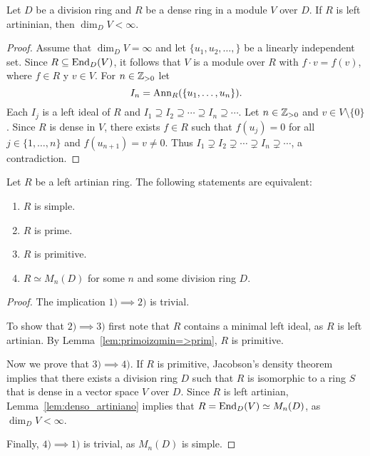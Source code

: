 \begin{lemma}
	\label{lem:denso_artiniano}
	Let $D$ be a division ring and $R$ be a dense ring in a module $V$ over $D$. 
	If $R$ is left artininian, then $\dim_DV<\infty$.
\end{lemma}

\begin{proof}
	Assume that $\dim_DV=\infty$ and let $\{u_1,u_2,\dots,\}$ be a linearly independent set. 
	Since $R\subseteq\operatorname{End}_D(V)$, it follows that 
	$V$ is a module over $R$ with $f\cdot v=f(v)$, where $f\in R$ y $v\in V$. 
	For $n\in\mathbb{Z}_{>0}$ let 
	\[
		I_n=\operatorname{Ann}_R(\{u_1,\dots,u_n\}).
	\]
	Each $I_j$ is a left ideal of $R$ and $I_1\supseteq
	I_2\supseteq\cdots\supseteq I_n\supseteq\cdots$. Let 
	$n\in\mathbb{Z}_{>0}$ and $v\in V\setminus\{0\}$. Since $R$ is dense
	in $V$, there exists $f\in R$ such that $f(u_j)=0$ for all $j\in\{1,\dots,n\}$ and 
	$f(u_{n+1})=v\ne0$. Thus $I_1\supsetneq I_2\supsetneq\cdots\supsetneq
	I_n\supsetneq\cdots$, a contradiction.
\end{proof}

\begin{theorem}[Wedderburn]
	Let $R$ be a left artinian ring. The following statements are equivalent:
	\begin{enumerate}
		\item $R$ is simple.
		\item $R$ is prime.
		\item $R$ is primitive.
		\item $R\simeq M_n(D)$ for some $n$ and some division ring $D$.
	\end{enumerate}
\end{theorem}

\begin{proof}
	The implication $1)\implies2)$ is trivial. 
	
	To show that $2)\implies3)$ first note that 
	$R$ contains a minimal left ideal, as $R$ is left artinian. 
	By Lemma~\ref{lem:primoizqmin=>prim}, $R$ is primitive. 

	Now we prove that $3)\implies4)$. If $R$ is primitive, 
	Jacobson's density theorem implies that there exists a division
	ring $D$ such that  
	$R$ is isomorphic to a ring $S$ that is dense in a vector space $V$ over $D$.
	Since $R$ is left artinian, Lemma~\ref{lem:denso_artiniano} implies that  
	$R=\operatorname{End}_D(V)\simeq M_n(D)$, as $\dim_DV<\infty$. 

	Finally, $4)\implies1)$ is trivial, as $M_n(D)$ is simple. 
\end{proof}

